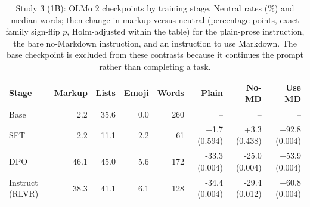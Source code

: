 \begin{table}[t]
\centering
\footnotesize
\caption{Study 3 (1B): OLMo 2 checkpoints by training stage. Neutral rates (\%) and median words; then change in markup versus neutral (percentage points, exact family sign-flip $p$, Holm-adjusted within the table) for the plain-prose instruction, the bare no-Markdown instruction, and an instruction to use Markdown. The base checkpoint is excluded from these contrasts because it continues the prompt rather than completing a task.}
\label{tab:v2-stages}
\begin{tabular}{lrrrrrrr}
\toprule
Stage & Markup & Lists & Emoji & Words & Plain & No-MD & Use MD \\
\midrule
Base & 2.2 & 35.6 & 0.0 & 260 & -- & -- & -- \\
SFT & 2.2 & 11.1 & 2.2 & 61 & +1.7 (0.594) & +3.3 (0.438) & +92.8 (0.004) \\
DPO & 46.1 & 45.0 & 5.6 & 172 & -33.3 (0.004) & -25.0 (0.004) & +53.9 (0.004) \\
Instruct (RLVR) & 38.3 & 41.1 & 6.1 & 128 & -34.4 (0.004) & -29.4 (0.012) & +60.8 (0.004) \\
\bottomrule
\end{tabular}
\end{table}
